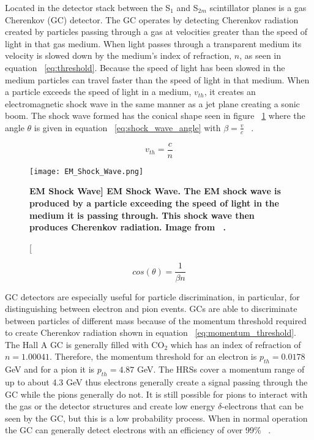Located in the detector stack between the S$_1$ and S$_{2m}$ scintillator planes is a gas Cherenkov (GC) detector. The GC operates by detecting Cherenkov radiation created by particles passing through a gas at velocities greater than the speed of light in that gas medium. When light passes through a transparent medium its velocity is slowed down by the medium's index of refraction, $n$, as seen in equation ~\ref{eq:threshold}. Because the speed of light has been slowed in the medium particles can travel faster than the speed of light in that medium. When a particle exceeds the speed of light in a medium, $v_{th}$, it creates an electromagnetic shock wave in the same manner as a jet plane creating a sonic boom. The shock wave formed has the conical shape seen in figure ~\ref{fig:em_shock_wave} where the angle $\theta$ is given in equation ~\ref{eq:shock_wave_angle} with $\beta = \frac{v}{c}$ ~\cite{Book:Leo}.

\begin{equation} \label{eq:threshold}
	v_{th} = \frac{c}{n}
\end{equation}

\begin{figure}[!ht]
\begin{center}
\texttt{[image: EM\_Shock\_Wave.png]}
\end{center}
\caption[\bf{EM Shock Wave}]{
{\bf{EM Shock Wave.}} The EM shock wave is produced by a particle exceeding the speed of light in the medium it is passing through. This shock wave then produces Cherenkov radiation. Image from ~\cite{Thesis:Cummings}.}
\label{fig:em_shock_wave}
\end{figure}

\begin{equation} \label{eq:shock_wave_angle}
	cos(\theta) = \frac{1}{\beta n}
\end{equation}

GC detectors are especially useful for particle discrimination, in particular, for distinguishing between electron and pion events. GCs are able to discriminate between particles of different mass because of the momentum threshold required to create Cherenkov radiation shown in equation ~\ref{eq:momentum_threshold}. The Hall A GC is generally filled with CO$_2$ which has an index of refraction of $n=1.00041$. Therefore, the momentum threshold for an electron is $p_{th}=0.0178$ GeV and for a pion it is $p_{th}=4.87$ GeV. The HRSs cover a momentum range of up to about 4.3 GeV thus electrons generally create a signal passing through the GC while the pions generally do not. It is still possible for pions to interact with the gas or the detector structures and create low energy $\delta$-electrons that can be seen by the GC, but this is a low probability process. When in normal operation the GC can generally detect electrons with an efficiency of over 99$\%$ ~\cite{Thesis:Ye}.


